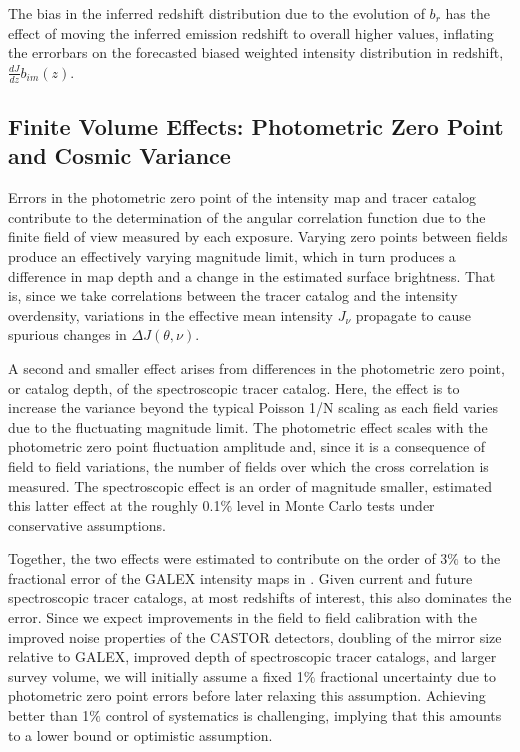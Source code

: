 \documentclass[fleqn,usenatbib]{mnras}
\begin{document}
The bias in the inferred redshift distribution due to the evolution of $b_{r}$ has the effect of moving the inferred emission redshift to overall higher values, inflating the errorbars on the forecasted biased weighted intensity distribution in redshift, $\frac{dJ}{dz}b_{im}(z)$. 


\subsection{Finite Volume Effects: Photometric Zero Point and Cosmic Variance} 
\label{sec:zeropoint}

Errors in the photometric zero point of the intensity map and tracer catalog contribute to the determination of the angular correlation function \citep{Coil2004} due to the finite field of view measured by each exposure. Varying zero points between fields produce an effectively varying magnitude limit, which in turn produces a difference in map depth and a change in the estimated surface brightness. That is, since we take correlations between the tracer catalog and the intensity overdensity, variations in the effective mean intensity $J_{\nu}$ propagate to cause spurious changes in $\Delta J(\theta, \nu)$.


A second and smaller effect arises from differences in the photometric zero point, or catalog depth, of the spectroscopic tracer catalog. Here, the effect is to increase the variance beyond the typical Poisson 1/N scaling as each field varies due to the fluctuating magnitude limit. The photometric effect scales with the photometric zero point fluctuation amplitude and, since it is a consequence of field to field variations, the number of fields over which the cross correlation is measured. The spectroscopic effect is an order of magnitude smaller, \citet{Newman_2008} estimated this latter effect at the roughly 0.1$\%$ level in Monte Carlo tests under conservative assumptions.

Together, the two effects were estimated to contribute on the order of $3\%$ to the fractional error of the GALEX intensity maps in \citet{Chiang_2019}. Given current and future spectroscopic tracer catalogs, at most redshifts of interest, this also dominates the error. Since we expect improvements in the field to field calibration with the improved noise properties of the {\small CASTOR} detectors, doubling of the mirror size relative to GALEX, improved depth of spectroscopic tracer catalogs, and larger survey volume, we will initially assume a fixed 1$\%$ fractional uncertainty due to photometric zero point errors before later relaxing this assumption. Achieving better than 1$\%$ control of systematics is challenging, implying that this amounts to a lower bound or optimistic assumption.
\end{document}
